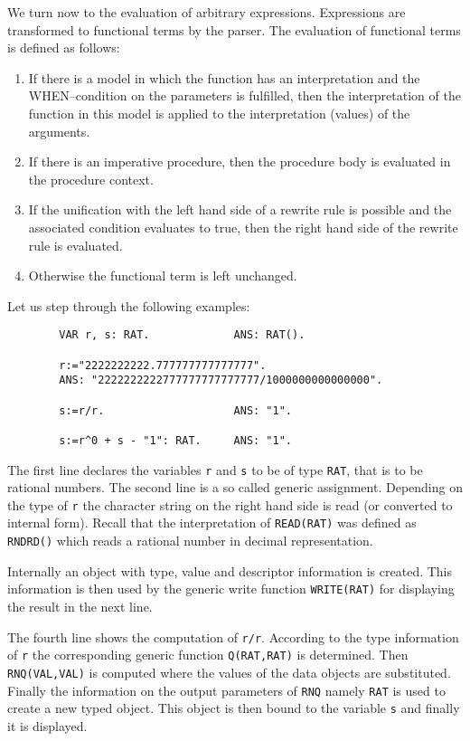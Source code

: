 We turn now to the evaluation of arbitrary expressions.
Expressions are transformed to functional terms by the parser. 
The evaluation of functional terms is defined as follows:
\begin{enumerate}
\item If there is a model in which the function has an interpretation
      and the WHEN--condition on the parameters is fulfilled,
      then the interpretation of the function in this model is 
      applied to the interpretation (values) of the arguments.   
\item If there is an imperative procedure, then the procedure body 
      is evaluated in the procedure context.
\item If the unification with the left hand side of a rewrite rule 
      is possible and the associated condition evaluates to true, 
      then the right hand side of the rewrite rule is evaluated.
\item Otherwise the functional term is left unchanged.
\end{enumerate}

Let us step through the following examples:
\begin{verbatim}
        VAR r, s: RAT.             ANS: RAT().

        r:="2222222222.777777777777777".
        ANS: "2222222222777777777777777/1000000000000000".

        s:=r/r.                    ANS: "1".

        s:=r^0 + s - "1": RAT.     ANS: "1".
\end{verbatim}
The first line declares the variables \verb/r/ and \verb/s/ 
to be of type \verb/RAT/, that is to be rational numbers. 
The second line is a so called generic assignment. 
Depending on the type of \verb/r/ the character string on the
right hand side is read (or converted to internal form). 
Recall that the interpretation of \verb/READ(RAT)/ 
was defined as \verb/RNDRD()/ which reads a rational number 
in decimal representation. 

Internally an object with type, value and descriptor information 
is created. This information is then used by the 
generic write function \verb/WRITE(RAT)/ for displaying 
the result in the next line.

The fourth line shows the computation of \verb.r/r.. 
According to the type information of \verb/r/ the 
corresponding generic function \verb/Q(RAT,RAT)/ is determined. 
Then \verb/RNQ(VAL,VAL)/ is computed where the 
values of the data objects are substituted. 
Finally the information on the output parameters of 
\verb/RNQ/ namely \verb/RAT/ is used to create 
a new typed object. This object is then bound to 
the variable \verb/s/ and finally it is displayed.

